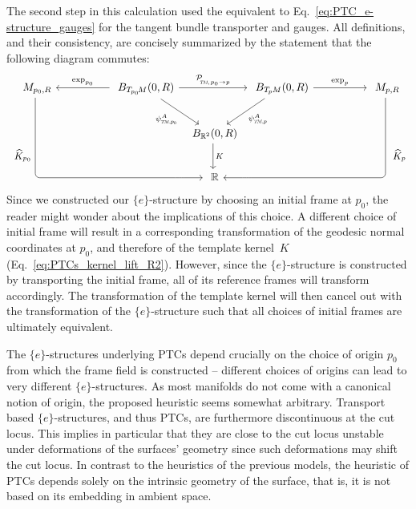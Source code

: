 The second step in this calculation used the equivalent to Eq.~\eqref{eq:PTC_e-structure_gauges} for the tangent bundle transporter and gauges.
All definitions, and their consistency, are concisely summarized by the statement that the following diagram commutes:
\begin{equation}\label{cd:PTC_kernel_2}
\begin{tikzcd}[column sep=50, row sep=24, font=\normalsize]
    M_{p_0,R}
        \arrow[ddrr, rounded corners, to path={ 
                |-node[left, pos=.36]{\small$\widehat{K}_{p_0}$} ([xshift=-5.ex]\tikztotarget.west) 
                -- (\tikztotarget.west)
                }]
    & B_{T_{\mkern-1.mu p_0}\!M}(0,R)
        \arrow[l, "\exp_{p_0}"']
        \arrow[rr, "\mathcal{P}_{\mkern-2mu\overset{}{\protect\scalebox{.6}{$\!T\!M$}\mkern-2mu,\mkern1mu p_0\to p}}"]
        \arrow[dr, "\psi_{\protect\scalebox{.6}{$T\!M,$}\protect\scalebox{.7}{$p_0$}}^A"']
    &[-45pt]
    &[-45pt]
      B_{\TpM}(0,R)
        \arrow[dl, "\psiTMp^A"]
        \arrow[r, "\exp_p"]
    & M_{p,R}
        \arrow[ddll, rounded corners, to path={ 
                |-node[right, pos=.36]{\small$\widehat{K}_p$} ([xshift=5.ex]\tikztotarget.east) 
                -- (\tikztotarget.east)
                }]
    \\
    & & B_{\R^2}(0,R)
        \arrow[d, "K"]
    \\
    & & \R
\end{tikzcd}
\end{equation}
Since we constructed our $\{e\}$-structure by choosing an initial frame at $p_0$, the reader might wonder about the implications of this choice.
A different choice of initial frame will result in a corresponding transformation of the geodesic normal coordinates at $p_0$, and therefore of the template kernel~$K$ (Eq.~\eqref{eq:PTCs_kernel_lift_R2}).
However, since the $\{e\}$-structure is constructed by transporting the initial frame, all of its reference frames will transform accordingly.
The transformation of the template kernel will then cancel out with the transformation of the $\{e\}$-structure such that all choices of initial frames are ultimately equivalent.


The $\{e\}$-structures underlying PTCs depend crucially on the choice of origin $p_0$ from which the frame field is constructed
-- different choices of origins can lead to very different $\{e\}$-structures.
As most manifolds do not come with a canonical notion of origin, the proposed heuristic seems somewhat arbitrary.
Transport based $\{e\}$-structures, and thus PTCs, are furthermore discontinuous at the cut locus.
This implies in particular that they are close to the cut locus unstable under deformations of the surfaces' geometry since such deformations may shift the cut locus.
In contrast to the heuristics of the previous models, the heuristic of PTCs depends solely on the intrinsic geometry of the surface, that is, it is not based on its embedding in ambient space.


